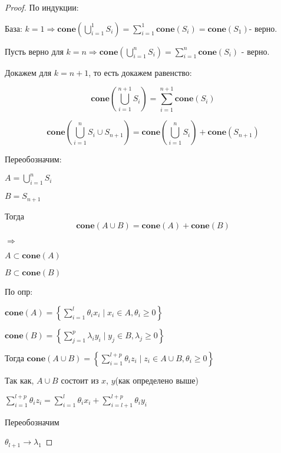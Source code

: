 \documentclass[a4paper,12pt]{article}
\begin{document}
\begin{proof}
По индукции:

База: $k = 1 \Rightarrow \mathbf{cone} \left( \bigcup\limits_{i=1}^1 S_i\right) = \sum\limits_{i=1}^1 \mathbf{cone}\left( S_i\right) = \mathbf{cone} \left( S_1\right)$- верно.

Пусть верно для $k = n \Rightarrow \mathbf{cone} \left( \bigcup\limits_{i=1}^n S_i\right) = \sum\limits_{i=1}^n \mathbf{cone} \left( S_i\right) $ - верно.

Докажем для $k = n+1$, то есть докажем равенство: 

$$\mathbf{cone} \left( \bigcup\limits_{i=1}^{n+1} S_i\right) = \sum\limits_{i=1}^{n+1} \mathbf{cone} \left( S_i\right)$$

$$\mathbf{cone} \left( \bigcup\limits_{i=1}^{n} S_i \cup S_{n+1}\right) = \mathbf{cone} \left(\bigcup\limits_{i=1}^{n} S_i\right) + \mathbf{cone}\left( S_{n+1}\right)$$

Переобозначим:

$A = \bigcup\limits_{i=1}^{n} S_i$

$B = S_{n+1}$

Тогда $$\mathbf{cone}\left( A \cup B\right) = \mathbf{cone}\left( A \right)+ \mathbf{cone}\left( B\right)$$

$\Longrightarrow $

$A \subset \mathbf{cone}\left( A\right)$

$B \subset \mathbf{cone}\left( B\right)$

По опр:

$\mathbf{cone}(A) = \left\{ \sum\limits_{i=1}^l\theta_i x_i \mid x_i \in A, \theta_i \ge 0\right\}$

$\mathbf{cone}(B) = \left\{ \sum\limits_{j=1}^p\lambda_i y_i \mid y_j \in B, \lambda_j \ge 0\right\}$

Тогда 
$\mathbf{cone}(A \cup B) = \left\{ \sum\limits_{i=1}^{l+p}\theta_i z_i   \mid z_i \in A\cup B, \theta_i \ge 0\right\}$

Так как, $A\cup B$ состоит из $x$, $y$(как определено выше)

$\sum\limits_{i=1}^{l+p}\theta_i z_i = \sum\limits_{i=1}^l\theta_i x_i + \sum\limits_{i=l+1}^{l+p}\theta_i y_i$

\vspace{\baselineskip}
\vspace{\baselineskip}
\vspace{\baselineskip}
Переобозначим 

$\theta_{l+1} \rightarrow \lambda_1$


\end{proof}
\end{document}
